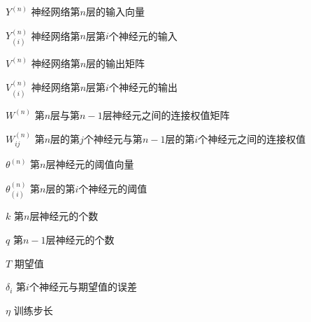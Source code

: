\begin{denotation}[3cm]
\item[$Y^{(n)}$]神经网络第$n$层的输入向量 
\item[$Y^{(n)}_{(i)}$]神经网络第$n$层第$i$个神经元的输入
\item[$V^{(n)}$]神经网络第$n$层的输出矩阵
\item[$V^{(n)}_{(i)}$]神经网络第$n$层第$i$个神经元的输出 
\item[$W^{(n)}$]第$n$层与第$n-1$层神经元之间的连接权值矩阵
\item[$W^{(n)}_{ij}$]第$n$层的第$j$个神经元与第$n-1$层的第$i$个神经元之间的连接权值
\item[$\theta^{(n)}$]第$n$层神经元的阈值向量
\item[$\theta^{(n)}_{(i)}$]第$n$层的第$i$个神经元的阈值
\item[$k$]第$n$层神经元的个数
\item[$q$]第$n-1$层神经元的个数
\item[$T$]期望值
\item[$\delta_{i}$]第$i$个神经元与期望值的误差
\item[$\eta$]训练步长
\end{denotation}
